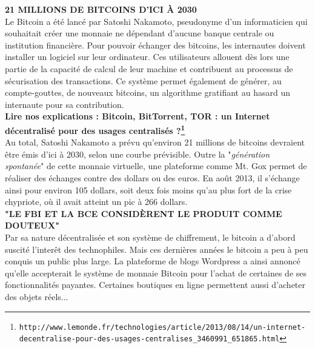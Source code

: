 \documentclass[11pt,twoside,a4paper]{article}
\begin{document}
\textbf{21 MILLIONS DE BITCOINS D'ICI {\`A} 2030} ~\\

Le Bitcoin a {\'e}t{\'e} lanc{\'e} par Satoshi Nakamoto, pseudonyme d'un informaticien qui souhaitait cr{\'e}er une monnaie ne d{\'e}pendant d'aucune banque centrale ou institution financi{\`e}re. Pour pouvoir {\'e}changer des bitcoins, les internautes doivent installer un logiciel sur leur ordinateur. Ces utilisateurs allouent d{\`e}s lors une partie de la capacit{\'e} de calcul de leur machine et contribuent au processus de s{\'e}curisation des transactions. Ce syst{\`e}me permet {\'e}galement de g{\'e}n{\'e}rer, au compte-gouttes, de nouveaux bitcoins, un algorithme gratifiant au hasard un internaute pour sa contribution. ~\\

\textbf{Lire nos explications : Bitcoin, BitTorrent, TOR : un Internet d{\'e}centralis{\'e} pour des usages centralis{\'e}s ?\footnote{\texttt{http://www.lemonde.fr/technologies/article/2013/08/14/un-internet-decentralise-pour-des-usages-centralises\_3460991\_651865.html}}} ~\\

Au total, Satoshi Nakamoto a pr{\'e}vu qu'environ 21 millions de bitcoins devraient {\^e}tre {\'e}mis d'ici {\`a} 2030, selon une courbe pr{\'e}visible. Outre la "\emph{g{\'e}n{\'e}ration spontan{\'e}e}" de cette monnaie virtuelle, une plateforme comme Mt. Gox permet de r{\'e}aliser des {\'e}changes contre des dollars ou des euros. En ao{\^u}t 2013, il s'{\'e}change ainsi pour environ 105 dollars, soit deux fois moins qu'au plus fort de la crise chypriote, o{\`u} il avait atteint un pic {\`a} 266 dollars. ~\\ 

\textbf{"LE FBI ET LA BCE CONSID{\`E}RENT LE PRODUIT COMME DOUTEUX"} ~\\

Par sa nature d{\'e}centralis{\'e}e et son syst{\`e}me de chiffrement, le bitcoin a d'abord suscit{\'e} l'inter{\^e}t des technophiles. Mais ces derni{\`e}res ann{\'e}es le bitcoin a peu {\`a} peu conquis un public plus large. La plateforme de blogs Wordpress a ainsi annonc{\'e} qu'elle accepterait le syst{\`e}me de monnaie Bitcoin pour l'achat de certaines de ses fonctionnalit{\'e}s payantes. Certaines boutiques en ligne permettent aussi d'acheter des objets r{\'e}els... ~\\
\end{document}
